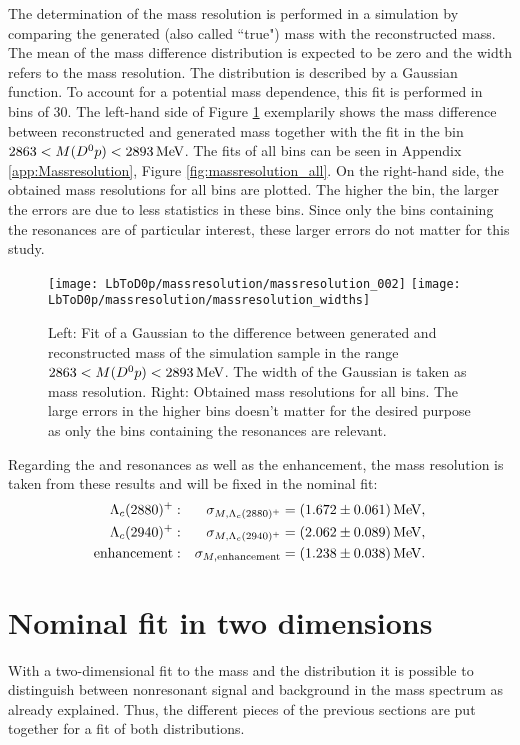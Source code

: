 The determination of the mass resolution is performed in a simulation by comparing the generated (also called ``true") mass with the reconstructed mass.
The mean of the mass difference distribution is expected to be zero and the width refers to the mass resolution.
The distribution is described by a Gaussian function.
To account for a potential mass dependence, this fit is performed in bins of 30\mev.
The left-hand side of Figure \ref{fig:massresolution} exemplarily shows the mass difference between reconstructed and generated mass together with the fit in the bin $2863 < M({{D}^0}{p}) < 2893 \mathrm{\,Me\kern -0.1em V}$. 
The fits of all bins can be seen in Appendix \ref{app:Massresolution}, Figure \ref{fig:massresolution_all}.
On the right-hand side, the obtained mass resolutions for all bins are plotted.
The higher the bin, the larger the errors are due to less statistics in these bins.
Since only the bins containing the resonances are of particular interest, these larger errors do not matter for this study.
\begin{figure}[hptb]
    \centering
	\texttt{[image: LbToD0p/massresolution/massresolution\_002]}
	\texttt{[image: LbToD0p/massresolution/massresolution\_widths]}
	\caption{Left: Fit of a Gaussian to the difference between generated and reconstructed \Dz\proton mass of the simulation sample in the range $2863 < M({{D}^0}{p}) < 2893 \mathrm{\,Me\kern -0.1em V}$. The width of the Gaussian is taken as mass resolution. Right: Obtained mass resolutions for all bins. 
             The large errors in the higher bins doesn't matter for the desired purpose as only the bins containing the resonances are relevant.}
    \label{fig:massresolution}
\end{figure}

Regarding the \LcResI and \LcResII resonances as well as the enhancement, the mass resolution is taken from these results and will be fixed in the nominal fit:
\begin{align*}
    {\ensuremath{\Lambda}}_{c}(2880)^+:           && \sigma_{M,{\Lambda}_{c}(2880)^+}            &= (1.672 \pm 0.061) \mathrm{\,Me\kern -0.1em V}, \\
    {\Lambda}_{c}(2940)^+:          && \sigma_{M,{\Lambda}_{c}(2940)^+}           &= (2.062 \pm 0.089) \mathrm{\,Me\kern -0.1em V}, \\
    \text{enhancement}:&& \sigma_{M,\text{enhancement}} &= (1.238 \pm 0.038) \mathrm{\,Me\kern -0.1em V}.
\end{align*}

\section{Nominal fit in two dimensions}
\label{sec:Fit_2D}
With a two-dimensional fit to the \Dz\proton mass and the \logIP distribution it is possible to distinguish between nonresonant signal and background in the \Dz\proton mass spectrum as already explained.
Thus, the different pieces of the previous sections are put together for a fit of both distributions.

